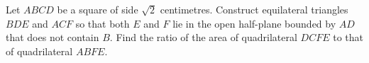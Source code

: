 Let $ABCD$ be a square of side $\sqrt2$ centimetres. Construct equilateral triangles $BDE$ and $ACF$ so that both $E$ and $F$ lie in the open half-plane bounded by $AD$ that does not contain $B$. Find the ratio of the area of quadrilateral $DCFE$ to that of quadrilateral $ABFE$.
